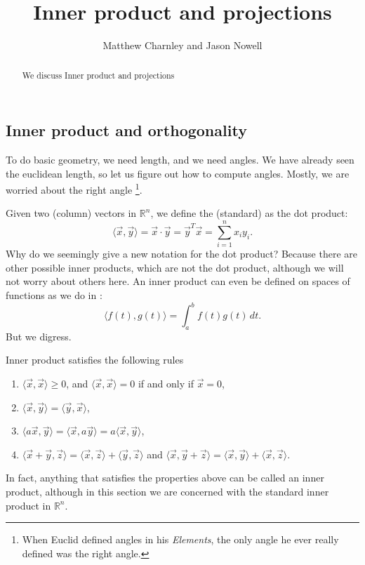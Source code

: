 \documentclass{ximera}
\title{Inner product and projections}
\author{Matthew Charnley and Jason Nowell}
\begin{document}
\begin{abstract}
    We discuss Inner product and projections
\end{abstract}
\maketitle

\label{innerproduct:section}



\subsection{Inner product and orthogonality}

To do basic geometry, we need length, and we need angles. We have already seen the euclidean length, so let us figure out how to compute angles.  Mostly, we are worried about the right angle%
\footnote{When Euclid defined angles in his \emph{Elements}, the only angle he ever really defined was the right angle.}.

Given two (column) vectors in ${\mathbb{R}}^n$, we define the (standard) \emph{} as the dot product:
\begin{equation*}
    \langle \vec{x} , \vec{y} \rangle = \vec{x} \cdot \vec{y} = \vec{y}^T \vec{x} = \sum_{i=1}^n x_i y_i .
\end{equation*}
Why do we seemingly give a new notation for the dot product? Because there are other possible inner products, which are not the dot product, although we will not worry about others here. An inner product can even be defined on spaces of functions as we do in
:
\begin{equation*}
    \langle f(t) , g(t) \rangle = \int_{a}^{b} f(t) g(t) \, dt .
\end{equation*}
But we digress.

Inner product satisfies the following rules
\begin{enumerate}
    \item $\langle \vec{x} , \vec{x} \rangle \geq 0$, and $\langle \vec{x} , \vec{x} \rangle = 0$ if and only if $\vec{x} = 0$,
    \item $\langle \vec{x} , \vec{y} \rangle = \langle \vec{y} , \vec{x} \rangle$,
    \item $\langle a\vec{x} , \vec{y} \rangle = \langle \vec{x} , a\vec{y} \rangle = a \langle \vec{x} , \vec{y} \rangle$,
    \item 
        $\langle \vec{x} +  \vec{y} , \vec{z} \rangle = \langle \vec{x} , \vec{z} \rangle + \langle \vec{y} , \vec{z} \rangle$ 
        and
        $\langle \vec{x}, \vec{y} + \vec{z} \rangle = \langle \vec{x} , \vec{y} \rangle + \langle \vec{x} , \vec{z} \rangle$.
\end{enumerate}
In fact, anything that satisfies the properties above can be called an inner product, although in this section we are concerned with the standard inner product in ${\mathbb{R}}^n$.
\end{document}

